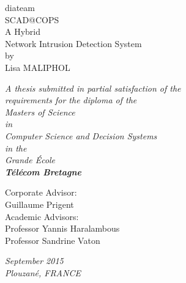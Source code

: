 \documentclass[11pt,a4paper]{article}
\begin{document}
\begin{center}

\vspace{30mm}

{\Huge diateam}\\
\bigskip
{\Huge SCAD@COPS}\\
\bigskip
\bigskip
{\Huge A Hybrid}\\
{\Huge Network Intrusion Detection System}\\
\vspace{15mm}
{\Large by}\\
\vspace{10mm}
{\huge Lisa MALIPHOL}\\

\vspace{25mm}

\textit{A thesis submitted in partial satisfaction of the}\\
\medskip
\textit{requirements for the diploma of the}\\
\medskip
\textit{Masters of Science}\\
\medskip
\textit{in}\\
\medskip
\textit{Computer Science and Decision Systems}\\
\medskip
\textit{in the}\\
\medskip
\textit{Grande École}\\
\medskip
\textbf{\textit{\Large Télécom Bretagne}}\\

\vspace{15mm}

Corporate Advisor:\\
\smallskip
Guillaume Prigent\\
\bigskip
\medskip
Academic Advisors:\\
\smallskip
Professor Yannis Haralambous\\
Professor Sandrine Vaton\\

\vspace{15mm}

\textit{September 2015}\\
\medskip
\textit{Plouzané, FRANCE}\\

\end{center}

\thispagestyle{empty} \newpage
\mbox{} \thispagestyle{empty}

\newpage
\end{document}
